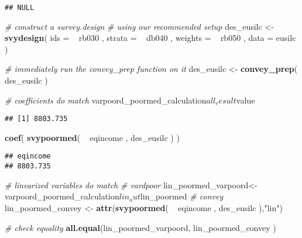 \documentclass[]{book}
\newenvironment{Shaded}{\begin{snugshade}}{\end{snugshade}}
\newcommand{\KeywordTok}[1]{\textcolor[rgb]{0.13,0.29,0.53}{\textbf{{#1}}}}
\newcommand{\DataTypeTok}[1]{\textcolor[rgb]{0.13,0.29,0.53}{{#1}}}
\newcommand{\StringTok}[1]{\textcolor[rgb]{0.31,0.60,0.02}{{#1}}}
\newcommand{\CommentTok}[1]{\textcolor[rgb]{0.56,0.35,0.01}{\textit{{#1}}}}
\newcommand{\NormalTok}[1]{{#1}}
\begin{document}
\begin{verbatim}
## NULL
\end{verbatim}

\begin{Shaded}
\begin{Highlighting}[]
\CommentTok{# construct a survey.design}
\CommentTok{# using our recommended setup}
\NormalTok{des_eusilc <-}\StringTok{ }
\StringTok{    }\KeywordTok{svydesign}\NormalTok{( }
        \DataTypeTok{ids =} \NormalTok{~}\StringTok{ }\NormalTok{rb030 , }
        \DataTypeTok{strata =} \NormalTok{~}\StringTok{ }\NormalTok{db040 ,  }
        \DataTypeTok{weights =} \NormalTok{~}\StringTok{ }\NormalTok{rb050 , }
        \DataTypeTok{data =} \NormalTok{eusilc}
    \NormalTok{)}

\CommentTok{# immediately run the convey_prep function on it}
\NormalTok{des_eusilc <-}\StringTok{ }\KeywordTok{convey_prep}\NormalTok{( des_eusilc )}

\CommentTok{# coefficients do match}
\NormalTok{varpoord_poormed_calculation$all_result$value}
\end{Highlighting}
\end{Shaded}

\begin{verbatim}
## [1] 8803.735
\end{verbatim}

\begin{Shaded}
\begin{Highlighting}[]
\KeywordTok{coef}\NormalTok{( }\KeywordTok{svypoormed}\NormalTok{( ~}\StringTok{ }\NormalTok{eqincome , des_eusilc ) )}
\end{Highlighting}
\end{Shaded}

\begin{verbatim}
## eqincome 
## 8803.735
\end{verbatim}

\begin{Shaded}
\begin{Highlighting}[]
\CommentTok{# linearized variables do match}
\CommentTok{# vardpoor}
\NormalTok{lin_poormed_varpoord<-}\StringTok{ }\NormalTok{varpoord_poormed_calculation$lin_out$lin_poormed}
\CommentTok{# convey }
\NormalTok{lin_poormed_convey <-}\StringTok{ }\KeywordTok{attr}\NormalTok{(}\KeywordTok{svypoormed}\NormalTok{( ~}\StringTok{ }\NormalTok{eqincome , des_eusilc ),}\StringTok{"lin"}\NormalTok{)}

\CommentTok{# check equality}
\KeywordTok{all.equal}\NormalTok{(lin_poormed_varpoord, lin_poormed_convey )}
\end{Highlighting}
\end{Shaded}
\end{document}
